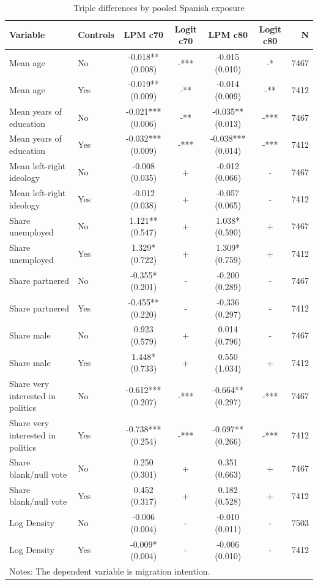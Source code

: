 \begin{table}[!htbp]
\centering
\caption{Triple differences by pooled Spanish exposure}
\label{tab:triple_pooled_share_key}
\small
\begin{tabular}{llccccr}
\hline
Variable & Controls & LPM c70 & Logit c70 & LPM c80 & Logit c80 & N \\
\hline
Mean age & No & -0.018** (0.008) & -*** & -0.015 (0.010) & -* & 7467 \\
Mean age & Yes & -0.019** (0.009) & -** & -0.014 (0.009) & -** & 7412 \\
Mean years of education & No & -0.021*** (0.006) & -** & -0.035** (0.013) & -*** & 7467 \\
Mean years of education & Yes & -0.032*** (0.009) & -*** & -0.038*** (0.014) & -*** & 7412 \\
Mean left-right ideology & No & -0.008 (0.035) & + & -0.012 (0.066) & - & 7467 \\
Mean left-right ideology & Yes & -0.012 (0.038) & + & -0.057 (0.065) & - & 7412 \\
Share unemployed & No & 1.121** (0.547) & + & 1.038* (0.590) & + & 7467 \\
Share unemployed & Yes & 1.329* (0.722) & + & 1.309* (0.759) & + & 7412 \\
Share partnered & No & -0.355* (0.201) & - & -0.200 (0.289) & - & 7467 \\
Share partnered & Yes & -0.455** (0.220) & - & -0.336 (0.297) & - & 7412 \\
Share male & No & 0.923 (0.579) & + & 0.014 (0.796) & - & 7467 \\
Share male & Yes & 1.448* (0.733) & + & 0.550 (1.034) & + & 7412 \\
Share very interested in politics & No & -0.612*** (0.207) & -*** & -0.664** (0.297) & -*** & 7467 \\
Share very interested in politics & Yes & -0.738*** (0.254) & -*** & -0.697** (0.266) & -*** & 7412 \\
Share blank/null vote & No & 0.250 (0.301) & + & 0.351 (0.663) & + & 7467 \\
Share blank/null vote & Yes & 0.452 (0.317) & + & 0.182 (0.528) & + & 7412 \\
Log Density & No & -0.006 (0.004) & - & -0.010 (0.011) & - & 7503 \\
Log Density & Yes & -0.009* (0.004) & - & -0.006 (0.010) & - & 7412 \\
\hline
\multicolumn{7}{l}{\footnotesize Notes: The dependent variable is migration intention.} \\

\end{tabular}
\end{table}
